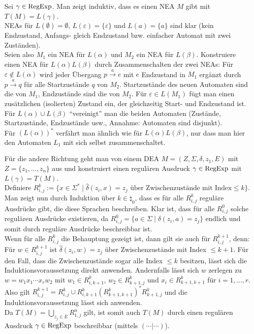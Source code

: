\begin{Beweis}
    Sei $\gamma \in \text{RegExp}$.
    Man zeigt induktiv, dass es einen NEA $M$ gibt mit $T(M) = L(\gamma)$.\\
    NEAs für $L(\emptyset) = \emptyset$,
    $L(\varepsilon) = \{\varepsilon\}$ und $L(a) = \{a\}$ sind klar
    (kein Endzustand, Anfangs- gleich Endzustand bzw.
    einfacher Automat mit zwei Zuständen).\\
    Seien also $M_1$ ein NEA für $L(\alpha)$ und $M_2$ ein NEA für $L(\beta)$.
    Konstruiere einen NEA für $L(\alpha)L(\beta)$ durch
    Zusammenschalten der zwei NEAs:
    Für $\varepsilon \notin L(\alpha)$ wird jeder Übergang
    $p \xrightarrow{a} e$ mit $e$ Endzustand in $M_1$ ergänzt durch
    $p \xrightarrow{a} q$ für alle Startzustände $q$ von $M_2$.
    Startzustände des neuen Automaten sind die von $M_1$,
    Endzustände sind die von $M_2$.
    Für $\varepsilon \in L(M_1)$ fügt man einen zusätzlichen (isolierten)
    Zustand ein, der gleichzeitig Start- und Endzustand ist.\\
    Für $L(\alpha) \cup L(\beta)$ "`vereinigt"' man die beiden Automaten
    (Zustände, Startzustände, Endzustände usw.,
    Annahme: Automaten sind disjunkt).\\
    Für $(L(\alpha))^\ast$ verfährt man ähnlich wie für
    $L(\alpha)L(\beta)$, nur dass man hier den Automaten $L_1$ mit sich selbst
    zusammenschaltet.

    Für die andere Richtung geht man von einem DEA
    $M = (Z, \Sigma, \delta, z_1, E)$ mit $Z = \{z_1, \dotsc, z_n\}$ aus
    und konstruiert einen regulären Ausdruck $\gamma \in \text{RegExp}$ mit
    $L(\gamma) = T(M)$.\\
    Definiere $R_{i,j}^k := \{x \in \Sigma^\ast \;|\;
    \widehat{\delta}(z_i, x) = z_j \text{ über Zwischenzustände mit Index}
    \le k\}$.\\
    Man zeigt nun durch Induktion über $k \in \natural_0$,
    dass es für alle $R_{i,j}^k$
    reguläre Ausdrücke gibt, die diese Sprachen beschreiben.
    Klar ist, dass für alle $R_{i,j}^0$ solche regulären Ausdrücke existieren,
    da
    $R_{i,j}^0 = \{a \in \Sigma \;|\; \delta(z_i, a) = z_j\}$ endlich
    und somit durch reguläre Ausdrücke beschreibbar ist.\\
    Wenn für alle $R_{i,j}^k$ die Behauptung gezeigt ist,
    dann gilt sie auch für $R_{i,j}^{k+1}$, denn:\\
    Für $w \in R_{i,j}^{k+1}$ ist $\widehat{\delta}(z_i, w) = z_j$ über
    Zwischenzustände mit Index $\le k + 1$.
    Für den Fall, dass die Zwischenzustände sogar alle Index $\le k$ besitzen,
    lässt sich die Induktionsvoraussetzung direkt anwenden.
    Andernfalls lässt sich $w$ zerlegen zu $w = w_1 x_1 \dotsb x_r w_2$
    mit $w_1 \in R_{i,k+1}^k$, $w_2 \in R_{k+1,j}^k$ und
    $x_i \in R_{k+1,k+1}^k$ für $i = 1, \dotsc, r$.
    Also gilt $R_{i,j}^{k+1} = R_{i,j}^k \cup
    R_{i,k+1}^k (R_{k+1,k+1}^k)^\ast R_{k+1,j}^k$
    und die Induktionsvoraussetzung lässt sich anwenden.\\
    Da $T(M) = \bigcup_{z_j \in E} R_{1,j}^n$ gilt, ist somit auch
    $T(M)$ durch einen regulären Ausdruck $\gamma \in \text{RegExp}$ beschreibbar
    (mittels $(\dotsb|\dotsb)$).
\end{Beweis}


